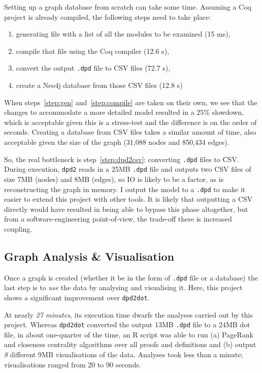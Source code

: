 Setting up a graph database from scratch can take some time. Assuming a Coq
project is already compiled, the following steps need to take place:

\begin{enumerate}
  \item\label{step:gen} generating file with a list of all the modules to be
    examined (15 ms),
  \item\label{step:compile} compile that file using the Coq compiler (12.6 s),
  \item\label{step:dpd2csv} convert the output \texttt{.dpd} file to CSV files (72.7 s),
  \item create a Neo4j database from those CSV files (12.8 s)
\end{enumerate}

When steps~\ref{step:gen} and~\ref{step:compile} are taken on their own, we see
that the changes to accommodate a more detailed model resulted in a 25\%
slowdown, which is acceptable given this is a stress-test and the difference is
on the order of seconds. Creating a database from CSV files takes a similar
amount of time, also acceptable given the size of the graph (31,088 nodes and
850,434 edges).

So, the real bottleneck is step~\ref{step:dpd2csv}: converting \texttt{.dpd}
files to CSV. During execution, \texttt{dpd2} reads in a 25MB \texttt{.dpd}
file and outputs two CSV files of size 7MB (nodes) and 8MB (edges), so IO is
likely to be a factor, as is reconstructing the graph in memory. I output the
model to a \texttt{.dpd} to make it easier to extend this project with other
tools. It is likely that outputting a CSV directly would have resulted in being
able to bypass this phase altogether, but from a software-engineering
point-of-view, the trade-off there is increased coupling.

\subsection{Graph Analysis \& Visualisation}

Once a graph is created (whether it be in the form of \texttt{.dpd} file or a
database) the last step is to \emph{use} the data by analysing and visualising
it. Here, this project shows a significant improvement over \texttt{dpd2dot}.

At nearly \emph{27 minutes}, its execution time dwarfs the analyses carried out
by this project. Whereas \texttt{dpd2dot} converted the output 13MB
\texttt{.dpd} file to a 24MB dot file, in about one-quarter of the time, an R
script was able to run (a) PageRank and closeness centrality algorithms over
all proofs and definitions and (b) output \emph{8} different 9MB visualisations
of the data. Analyses took less than a minute; visualisations ranged from 20 to
90 seconds.

